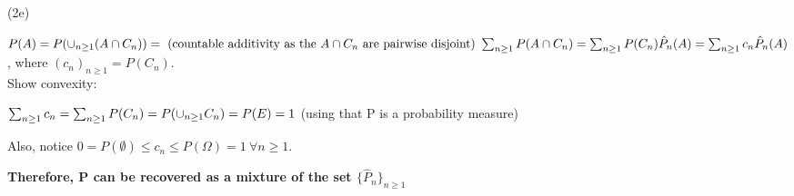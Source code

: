 (2e)

$ 
P(A) = 
P( \cunion[n] (A \cap C_n)) = \text{ (countable additivity as the $A \cap C_n$ are pairwise disjoint) }
\csum P(A \cap C_n) =
\csum P(C_n)\hat{P}_n(A) =
\csum c_n\hat{P}_n(A)
$
, where $ (c_n)_{n \geq 1} = P(C_n)$.\\

Show convexity:

$
\csum c_n 
= 
\csum P(C_n) 
= 
P(\cunion C_n)
=
P(E)
=
1
$
(using that P is a probability measure)

Also, notice $ 0 = P(\emptyset) \leq c_n \leq P(\Omega) = 1 \ \forall n\geq1$.

\textbf{Therefore, P can be recovered as a mixture of the set $\{\hat{P}_n\}_{n \geq 1}$}

